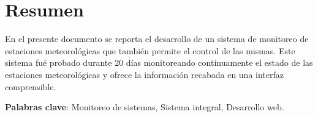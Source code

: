 \chapter*{Resumen}



En el presente documento se reporta el desarrollo de un sistema de monitoreo de estaciones meteorológicas que también permite el control de las mismas. Este sistema fué probado durante 20 días monitoreando contínuamente el estado de las estaciones meteorológicas y ofrece la información recabada en una interfaz comprensible.

\textbf{Palabras clave}: Monitoreo de sistemas, Sistema integral, Desarrollo web.
